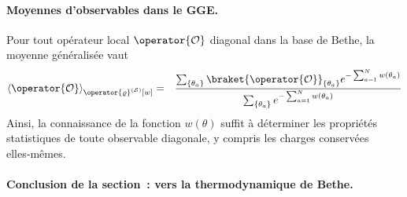\paragraph{Moyennes d'observables dans le GGE.}
Pour tout opérateur local $\operator{\mathcal{O}}$ diagonal dans la base de Bethe,
la moyenne généralisée vaut
\begin{eqnarray}\label{chap.2.moyenne.1}
	\langle \operator{\mathcal{O}}\rangle_{\operator{\varrho}^{(\mathcal{S})}[w]} & = & \displaystyle   \frac{\sum_{\{\theta_a \}} \braket{ \operator{\mathcal{O}}}_{\{ \theta_a\}} e^{- \sum_{a = 1}^N w(\theta_a) }  }{\sum_{\{\theta_a  \}} e^{- \sum_{a = 1}^N  w(\theta_a) } }
\end{eqnarray}
Ainsi, la connaissance de la fonction $w(\theta)$ suffit à déterminer
les propriétés statistiques de toute observable diagonale,
y compris les charges conservées elles‑mêmes.	
	

\paragraph{Conclusion de la section : vers la thermodynamique de Bethe.}

